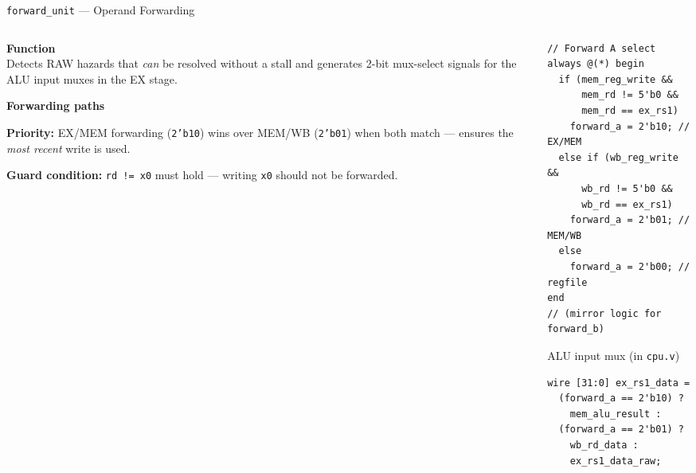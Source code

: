 \documentclass[aspectratio=169,10pt]{beamer}
\begin{document}
\begin{frame}[fragile]{\texttt{forward\_unit} --- Operand Forwarding}
  \begin{columns}[T]
    \begin{column}{0.52\textwidth}
      \textbf{Function}\\
      Detects RAW hazards that \emph{can} be resolved without a stall and generates 2-bit mux-select signals for the ALU input muxes in the EX stage.

      \vspace{0.5em}
      \textbf{Forwarding paths}


      \vspace{0.3em}
      \textbf{Priority:} EX/MEM forwarding (\texttt{2'b10}) wins over MEM/WB (\texttt{2'b01}) when both match --- ensures the \emph{most recent} write is used.

      \vspace{0.3em}
      \textbf{Guard condition:} \texttt{rd != x0} must hold --- writing \texttt{x0} should not be forwarded.
    \end{column}
    \begin{column}{0.44\textwidth}
\begin{lstlisting}
// Forward A select
always @(*) begin
  if (mem_reg_write &&
      mem_rd != 5'b0 &&
      mem_rd == ex_rs1)
    forward_a = 2'b10; // EX/MEM
  else if (wb_reg_write &&
      wb_rd != 5'b0 &&
      wb_rd == ex_rs1)
    forward_a = 2'b01; // MEM/WB
  else
    forward_a = 2'b00; // regfile
end
// (mirror logic for forward_b)
\end{lstlisting}
      \vspace{0.4em}
      \begin{block}{ALU input mux (in \texttt{cpu.v})}
\begin{lstlisting}[basicstyle=\ttfamily\tiny]
wire [31:0] ex_rs1_data =
  (forward_a == 2'b10) ?
    mem_alu_result :
  (forward_a == 2'b01) ?
    wb_rd_data :
    ex_rs1_data_raw;
\end{lstlisting}
      \end{block}
    \end{column}
  \end{columns}
\end{frame}
\end{document}
